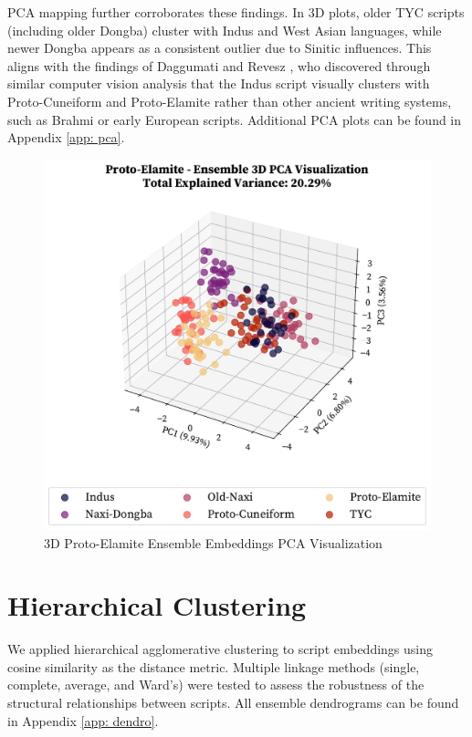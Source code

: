 \documentclass[11pt,a4paper,oneside]{report}
\begin{document}
PCA mapping further corroborates these findings. In 3D plots, older TYC scripts (including older Dongba) cluster with Indus and West Asian languages, while newer Dongba appears as a consistent outlier due to Sinitic influences. This aligns with the findings of Daggumati and Revesz \cite{daggumati_convolutional_2023, daggumati_data_2018, daggumati_data_2019}, who discovered through similar computer vision analysis that the Indus script visually clusters with Proto-Cuneiform and Proto-Elamite rather than other ancient writing systems, such as Brahmi or early European scripts. Additional PCA plots can be found in Appendix \ref{app: pca}.

\begin{figure}[H]  
    \centering
    \includegraphics[width=1\linewidth]{Visualizations/PCA/Proto-Elamite/ensemble_pca_3d.pdf}
    \caption{3D Proto-Elamite Ensemble Embeddings PCA Visualization}
    \label{fig:pca}
\end{figure}

\section{Hierarchical Clustering}
\noindent\hspace{1cm}
We applied hierarchical agglomerative clustering to script embeddings using cosine similarity as the distance metric. Multiple linkage methods (single, complete, average, and Ward's) were tested to assess the robustness of the structural relationships between scripts. All ensemble dendrograms can be found in Appendix \ref{app: dendro}.
\end{document}

